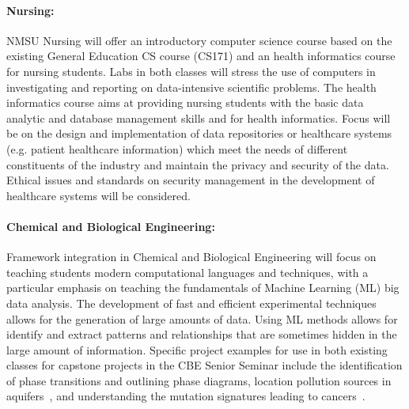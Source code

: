 \paragraph{Nursing:}
NMSU Nursing will offer an introductory computer science course based on the existing General Education CS course (CS171)
and an health informatics course for nursing students. 
Labs in both classes will stress the use of computers in investigating and reporting on data-intensive scientific problems. 
The health informatics course aims at providing nursing students with the basic data analytic and database management skills and for health informatics. Focus will be on the design and implementation of data repositories or healthcare systems (e.g. patient healthcare information) which meet the needs of different constituents of the industry and maintain the privacy and security of the data. Ethical issues and standards on security management in the development of healthcare systems will be considered. 
 
\paragraph{Chemical and Biological Engineering:}
Framework integration in Chemical and Biological Engineering will focus on teaching students modern computational languages and techniques, with a particular emphasis on teaching the fundamentals of Machine Learning (ML) big data analysis. The development of fast and efficient experimental techniques allows for the generation of large amounts of data. Using ML methods allows for identify and extract patterns and relationships that are sometimes hidden in the large amount of information. Specific project examples for use in both existing classes for capstone projects in the CBE Senior Seminar include the identification of phase transitions and outlining phase diagrams\cite{cbe1}, location pollution sources in aquifers~\cite{cbe2}, and understanding the mutation signatures leading to cancers~\cite{cbe3}.



